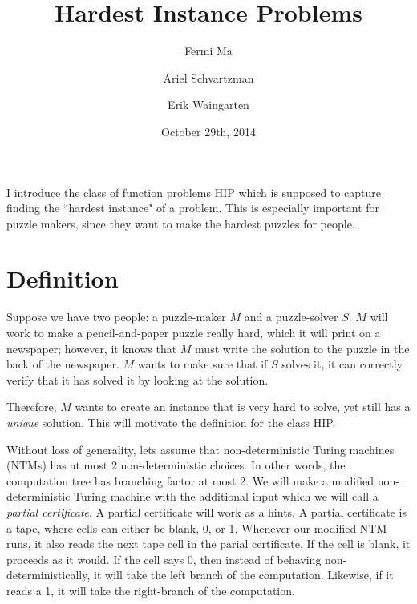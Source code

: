 \documentclass[runningheads,a4paper]{llncs}
\date{October 29th, 2014}							%
\begin{document}
\title{Hardest Instance Problems}
\titlerunning{}

\author{Fermi Ma \and Ariel Schvartzman \and Erik Waingarten}
%


\maketitle

I introduce the class of function problems HIP which is supposed to capture finding the ``hardest instance" of a problem. This is especially important for puzzle makers, since they want to make the hardest puzzles for people. 

\section{Definition}

Suppose we have two people: a puzzle-maker $M$ and a puzzle-solver $S$. $M$ will work to make a pencil-and-paper puzzle really hard, which it will print on a newspaper; however, it knows that $M$ must write the solution to the puzzle in the back of the newspaper. $M$ wants to make sure that if $S$ solves it, it can correctly verify that it has solved it by looking at the solution. 

Therefore, $M$ wants to create an instance that is very hard to solve, yet still has a \emph{unique} solution. This will motivate the definition for the class HIP. 

Without loss of generality, lets assume that non-deterministic Turing machines (NTMs) has at most $2$ non-deterministic choices. In other words, the computation tree has branching factor at most 2.  We will make a modified non-deterministic Turing machine with the additional input which we will call a \emph{partial certificate}. A partial certificate will work as a hints. A partial certificate is a tape, where cells can either be blank, 0, or 1. Whenever our modified NTM runs, it also reads the next tape cell in the parial certificate. If the cell is blank, it proceeds as it would. If the cell says 0, then instead of behaving non-deterministically, it will take the left branch of the computation. Likewise, if it reads a 1, it will take the right-branch of the computation.
\end{document}
